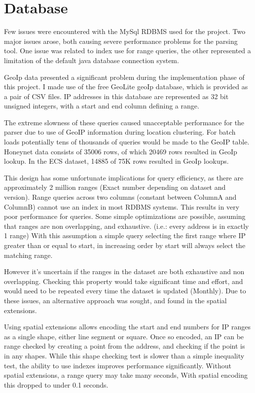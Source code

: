 \section{Database}\label{imp_db}
Few issues were encountered with the MySql RDBMS used for the project. Two major issues arose, both causing severe performance problems for the parsing tool. One issue was related to index use for range queries, the other represented a limitation of the default java database connection system. 

GeoIp data presented a significant problem during the implementation phase of this project. I made use of the free GeoLite geoIp database, which is provided as a pair of CSV files. IP addresses in this database are represented as 32 bit unsigned integers, with a start and end column defining a range.

The extreme slowness of these queries caused unacceptable performance for the parser due to use of GeoIP information during location clustering. For batch loads potentially tens of thousands of queries would be made to the GeoIP table. Honeynet data consists of 35006 rows, of which 20469 rows resulted in GeoIp lookup. In the ECS dataset, 14885 of 75K rows resulted in GeoIp lookups. 

This design has some unfortunate implications for query efficiency, as there are approximately 2 million ranges (Exact number depending on dataset and version). Range queries across two columns (constant between ColumnA and ColumnB) cannot use an index in most RDBMS systems. This results in very poor performance for queries.
Some simple optimizations are possible, assuming that ranges are non overlapping, and exhaustive. (i.e.: every address is in exactly 1 range)  With this assumption a simple query selecting the first range where IP greater than or equal to start, in increasing order by start will always select the matching range.

However it's uncertain if the ranges in the dataset are both exhaustive and non overlapping. Checking this property would take significant time and effort, and would need to be repeated  every time the dataset is updated (Monthly). Due to these issues, an alternative approach was sought, and found in the spatial extensions.

Using spatial extensions allows encoding the start and end numbers for IP ranges as a single shape, either line segment or square. Once so encoded, an IP can be range checked by creating a point from the address, and checking if the point is in any shapes. While this shape checking test is slower than a simple inequality test, the ability to use indexes improves performance significantly. Without spatial extensions, a range query may take many seconds, With spatial encoding this dropped to under 0.1 seconds.  

